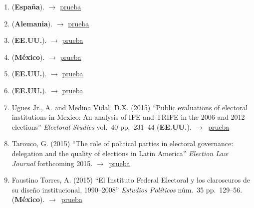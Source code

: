\documentclass[12 pt, letter]{article}
\newenvironment{CitasMiTrabajo}{
    \begin{footnotesize}
    \begin{enumerate}[label={\footnotesize\emph{cita~\arabic*}},ref=\arabic*] %
        \setlength{\itemsep}{.1\itemsep}
        \setlength{\parskip}{.1\parskip}
    }{\end{enumerate}\end{footnotesize}}
\begin{document}
\begin{CitasMiTrabajo}
        \item {} (\textbf{Espa\~na}).  $\rightarrow$ \href{http://ericmagar.com/cv/cites/estevezEtalElecStud/martinTrife2012amlh.pdf}{prueba}

        \item {} (\textbf{Alemania}).  $\rightarrow$ \href{http://ericmagar.com/cv/cites/estevezEtalElecStud/serraDemiseResurrection2013jpla.pdf}{prueba}

        \item {} (\textbf{EE.UU.}).  $\rightarrow$ \href{http://ericmagar.com/cv/cites/estevezEtalElecStud/diazDominguez2014phd.pdf}{prueba}

        \item {} (\textbf{M\'exico}).  $\rightarrow$ \href{http://ericmagar.com/cv/cites/estevezEtalElecStud/garciaEscon2014phd.pdf}{prueba}

        \item {} (\textbf{EE.UU.}).  $\rightarrow$ \href{http://ericmagar.com/cv/cites/estevezEtalElecStud/resendiz2014.pdf}{prueba}

        \item {} (\textbf{EE.UU.}).  $\rightarrow$ \href{http://ericmagar.com/cv/cites/estevezEtalElecStud/arevalo2015.pdf}{prueba}

        \item Ugues Jr., A. and Medina Vidal, D.X. (2015)
            ``Public evaluations of electoral institutions in Mexico: An analysis of IFE and TRIFE in the 2006 and 2012 elections''
            \emph{Electoral Studies}
            vol.\ 40 pp.\ 231--44 (\textbf{EE.UU.}). $\rightarrow$~\href{http://ericmagar.com/cv/cites/estevezEtalElecStud/ugues.medinaPubEvalElectoralInstitutionsMexico2015es.excerpt.pdf}{prueba}

       \item Tarouco, G. (2015)
            ``The role of political parties in electoral governance: delegation and the quality of elections in Latin America'' 
            \emph{Election Law Journal} forthcoming 2015. $\rightarrow$~\href{http://ericmagar.com/cv/cites/estevezEtalElecStud/taroucoRolePtiesEllGovernance2015elj.pdf}{prueba}

        \item Faustino Torres, A. (2015)
            ``El Instituto Federal Electoral y los claroscuros de su dise\~no institucional, 1990--2008''
            \emph{Estudios Pol\'iticos} n\'um.\ 35 pp.\ 129--56. (\textbf{M\'exico}). $\rightarrow$~\href{http://ericmagar.com/cv/cites/estevezEtalElecStud/faustino.excerpt.pdf}{prueba}


\end{CitasMiTrabajo}
\end{document}
